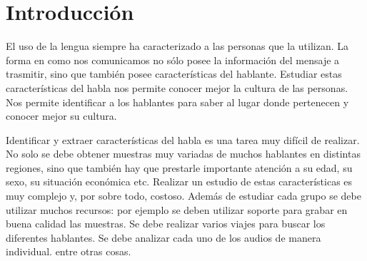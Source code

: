 \documentclass[11pt,a4paper,twoside]{tesis}
\begin{document}
\def\titulo{Licenciado }

\def\autor{Fernando Bugni}
\def\tituloTesis{Recolección online de grabaciones para el estudio de las variantes argentinas del español}
\def\runtitulo{Recolección online de grabaciones para el estudio de las variantes argentinas del español}
\def\runtitle{Star Wars: Rebellion and Empire}
\def\director{Agustín Gravano}
\def\codirector{Miguel Martínez Soler}
\def\lugar{Buenos Aires, 2014}


\frontmatter
\pagestyle{empty}


%

\cleardoublepage

\cleardoublepage

\cleardoublepage
\tableofcontents

\mainmatter
\pagestyle{headings}


\chapter{Introducción}


El uso de la lengua siempre ha caracterizado a las personas que la utilizan. La forma en como nos comunicamos no sólo posee la información del mensaje a trasmitir, sino que también posee características del hablante. Estudiar estas características del habla nos permite conocer mejor la cultura de las personas. Nos permite identificar a los hablantes para saber al lugar donde pertenecen y conocer mejor su cultura.

Identificar y extraer características del habla es una tarea muy difícil de realizar. No solo se debe obtener muestras muy variadas de muchos hablantes en distintas regiones, sino que también hay que prestarle importante atención a su edad, su sexo, su situación económica etc. Realizar un estudio de estas características es muy complejo y, por sobre todo, costoso. Además de estudiar cada grupo se debe utilizar muchos recursos: por ejemplo se deben utilizar soporte para grabar en buena calidad las muestras. Se debe realizar varios viajes para buscar los diferentes hablantes. Se debe analizar cada uno de los audios de manera individual. entre otras cosas. 
\end{document}
